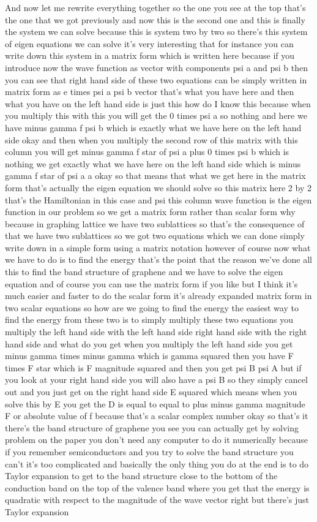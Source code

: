 And now let me rewrite everything together so the one you see at the top that's the one that we got previously and now this is the second one and this is finally the system we can solve because this is system two by two so there's this system of eigen equations we can solve it's very interesting that for instance you can write down this system in a matrix form which is written here because if you introduce now the wave function as vector with components psi a and psi b then you can see that right hand side of these two equations can be simply written in matrix form as e times psi a psi b vector that's what you have here and then what you have on the left hand side is just this how do I know this because when you multiply this with this you will get the 0 times psi a so nothing and here we have minus gamma f psi b which is exactly what we have here on the left hand side okay and then when you multiply the second row of this matrix with this column you will get minus gamma f star of psi a plus 0 times psi b which is nothing we get exactly what we have here on the left hand side which is minus gamma f star of psi a a okay so that means that what we get here in the matrix form that's actually the eigen equation we should solve so this matrix here 2 by 2 that's the Hamiltonian in this case and psi this column wave function is the eigen function in our problem so we get a matrix form rather than scalar form why because in graphing lattice we have two sublattices so that's the consequence of that we have two sublattices so we got two equations which we can done simply write down in a simple form using a matrix notation however of course now what we have to do is to find the energy that's the point that the reason we've done all this to find the band structure of graphene and we have to solve the eigen equation and of course you can use the matrix form if you like but I think it's much easier and faster to do the scalar form it's already expanded matrix form in two scalar equations so how are we going to find the energy the easiest way to find the energy from these two is to simply multiply these two equations you multiply the left hand side with the left hand side right hand side with the right hand side and what do you get when you multiply the left hand side you get minus gamma times minus gamma which is gamma squared then you have F times F star which is F magnitude squared and then you get psi B psi A but if you look at your right hand side you will also have a psi B so they simply cancel out and you just get on the right hand side E squared which means when you solve this by E you get the D is equal to equal to plus minus gamma magnitude F or absolute value of f because that's a scalar complex number okay so that's it there's the band structure of graphene you see you can actually get by solving problem on the paper you don't need any computer to do it numerically because if you remember semiconductors and you try to solve the band structure you can't it's too complicated and basically the only thing you do at the end is to do Taylor expansion to get to the band structure close to the bottom of the conduction band on the top of the valence band where you get that the energy is quadratic with respect to the magnitude of the wave vector right but there's just Taylor expansion 